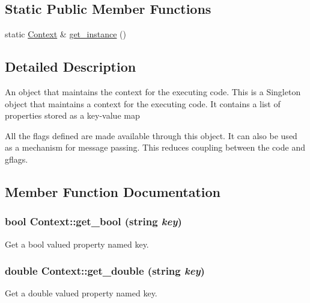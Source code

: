 \subsection*{Static Public Member Functions}
\begin{DoxyCompactItemize}
\item 
static \hyperlink{class_context}{Context} \& \hyperlink{class_context_a021d5f8012c65a185a9b14e210eb289c}{get\_\-instance} ()
\end{DoxyCompactItemize}


\subsection{Detailed Description}
An object that maintains the context for the executing code. This is a Singleton object that maintains a context for the executing code. It contains a list of properties stored as a key-\/value map

All the flags defined are made available through this object. It can also be used as a mechanism for message passing. This reduces coupling between the code and gflags. 

\subsection{Member Function Documentation}
\hypertarget{class_context_a16045011711b9cf47ef4a54c73427f43}{
\subsubsection[{get\_\-bool}]{\setlength{\rightskip}{0pt plus 5cm}bool Context::get\_\-bool (string {\em key})}}
\label{class_context_a16045011711b9cf47ef4a54c73427f43}


Get a bool valued property named key. 

\hypertarget{class_context_a71717f004732933da32ba9de6db156b3}{
\subsubsection[{get\_\-double}]{\setlength{\rightskip}{0pt plus 5cm}double Context::get\_\-double (string {\em key})}}
\label{class_context_a71717f004732933da32ba9de6db156b3}


Get a double valued property named key. 

